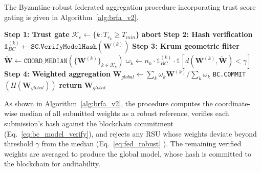 \documentclass[12pt, a4paper]{report}
\begin{document}
The Byzantine-robust federated aggregation
procedure incorporating trust score gating is given in
Algorithm~\ref{alg:brfa_v2}.

\begin{algorithm}[htb]
\caption{Updated Byzantine-Robust Federated Aggregation
(\texttt{BRFA-v2})}
\begin{algorithmic}[1]
\small
{}
  \State \textbf{Step 1: Trust gate}
  \State $\mathcal{K}_e\gets
         \{k:T_{r_k}\geq T_{min}\}$
         \hfill{}
    \State \textbf{abort}
           \hfill{}
  \EndIf
  \State \textbf{Step 2: Hash verification}
    \State $\mathbb{1}_{BC}^{(k)}\gets
           \texttt{SC.VerifyModelHash}(\mathbf{W}^{(k)})$
  \EndFor
  \State \textbf{Step 3: Krum geometric filter}
  \State $\tilde{\mathbf{W}}\gets
         \texttt{COORD\_MEDIAN}
         (\{\mathbf{W}^{(k)}\}_{k\in\mathcal{K}_e})$
    \State $\omega_k\gets n_k
           \cdot\mathbb{1}_{BC}^{(k)}
           \cdot\mathbb{1}[d(\mathbf{W}^{(k)},
           \tilde{\mathbf{W}}){<}\gamma]$
  \EndFor
  \State \textbf{Step 4: Weighted aggregation}
  \State $\mathbf{W}_{global}\gets
         {\textstyle\sum_k}\omega_k\mathbf{W}^{(k)}
         /{\textstyle\sum_k}\omega_k$
  \State \texttt{BC.COMMIT}$(H(\mathbf{W}_{global}))$
  \State \textbf{return} $\mathbf{W}_{global}$
\EndProcedure
\end{algorithmic}
\label{alg:brfa_v2}
\end{algorithm}


As shown in Algorithm~\ref{alg:brfa_v2}, the procedure computes 
the coordinate-wise median of all submitted weights as a robust reference, 
verifies each submission's hash against the blockchain commitment 
(Eq.~\ref{eq:bc_model_verify}), and rejects any RSU whose weights 
deviate beyond threshold $\gamma$ from the median (Eq.~\ref{eq:fed_robust}
). The remaining verified weights are averaged to produce the global 
model, whose hash is committed to the blockchain for auditability.
\end{document}
